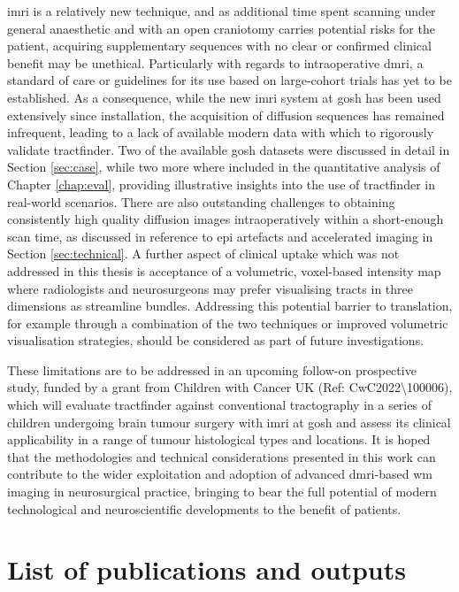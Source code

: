 \Gls{imri} is a relatively new technique, and as additional time spent scanning under general anaesthetic and with an open craniotomy carries potential risks for the patient, acquiring supplementary sequences with no clear or confirmed clinical benefit may be unethical.
Particularly with regards to intraoperative \gls{dmri}, a standard of care or guidelines for its use based on large-cohort trials has yet to be established.
As a consequence, while the new \gls{imri} system at \gls{gosh} has been used extensively since installation, the acquisition of diffusion sequences has remained infrequent, leading to a lack of available modern data with which to rigorously validate tractfinder.
Two of the available \gls{gosh} datasets were discussed in detail in Section \ref{sec:case}, while two more where included in the quantitative analysis of Chapter \ref{chap:eval}, providing illustrative insights into the use of tractfinder in real-world scenarios.
There are also outstanding challenges to obtaining consistently high quality diffusion images intraoperatively within a short-enough scan time, as discussed in reference to \gls{epi} artefacts and accelerated imaging in Section \ref{sec:technical}.
A further aspect of clinical uptake which was not addressed in this thesis is acceptance of a volumetric, voxel-based intensity map where radiologists and neurosurgeons may prefer visualising tracts in three dimensions as streamline bundles.
Addressing this potential barrier to translation, for example through a combination of the two techniques or improved volumetric visualisation strategies, should be considered as part of future investigations.

These limitations are to be addressed in an upcoming follow-on prospective study, funded by a grant from Children with Cancer UK (Ref: CwC2022\textbackslash 100006), which will evaluate tractfinder against conventional tractography in a series of children undergoing brain tumour surgery with \gls{imri} at \gls{gosh} and assess its clinical applicability in a range of tumour histological types and locations.
It is hoped that the methodologies and technical considerations presented in this work can contribute to the wider exploitation and adoption of advanced \gls{dmri}-based \gls{wm} imaging in neurosurgical practice, bringing to bear the full potential of modern technological and neuroscientific developments to the benefit of patients.

\chapter*{List of publications and outputs}


